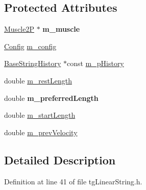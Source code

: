 \subsection*{Protected Attributes}
\begin{DoxyCompactItemize}
\item 
\hypertarget{classtg_linear_string_a6b9e3702b95ee50afbc34b78db478101}{\hyperlink{class_muscle2_p}{Muscle2\-P} $\ast$ {\bfseries m\-\_\-muscle}}\label{classtg_linear_string_a6b9e3702b95ee50afbc34b78db478101}

\item 
\hyperlink{structtg_base_string_1_1_config}{Config} \hyperlink{classtg_base_string_ac13cae3d6eb82d20b182be6aaa5e4fe0}{m\-\_\-config}
\item 
\hyperlink{structtg_base_string_1_1_base_string_history}{Base\-String\-History} $\ast$const \hyperlink{classtg_base_string_ab50177e75064ed5863e497cad34df60a}{m\-\_\-p\-History}
\item 
double \hyperlink{classtg_base_string_a7e5cf579c266faed950ee215bf1bc596}{m\-\_\-rest\-Length}
\item 
\hypertarget{classtg_base_string_a6666588cac8003ed2ba3d87eeee6075d}{double {\bfseries m\-\_\-preferred\-Length}}\label{classtg_base_string_a6666588cac8003ed2ba3d87eeee6075d}

\item 
double \hyperlink{classtg_base_string_a14e96c33278197f084ee733b93123b0e}{m\-\_\-start\-Length}
\item 
double \hyperlink{classtg_base_string_af54d1188ce7eb296b3b1df2224286424}{m\-\_\-prev\-Velocity}
\end{DoxyCompactItemize}


\subsection{Detailed Description}


Definition at line 41 of file tg\-Linear\-String.\-h.



